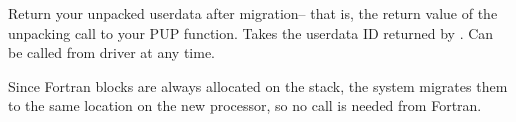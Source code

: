 \documentclass[10pt]{article}
\begin{document}

     Return your unpacked userdata after migration-- that is, the
     return value of the unpacking call to your PUP function.  Takes
     the userdata ID returned by .  Can be called from
     driver at any time.

     Since Fortran blocks are always allocated on the stack, the system
     migrates them to the same location on the new processor, so no
      call is needed from Fortran.

\end{document}
